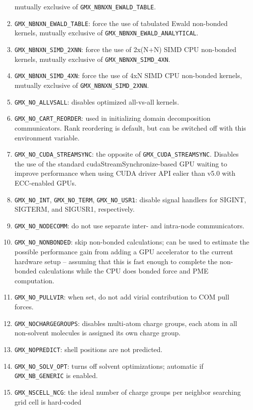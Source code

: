 \begin{enumerate}
        mutually exclusive of {\tt GMX_NBNXN_EWALD_TABLE}.
\item   {\tt GMX_NBNXN_EWALD_TABLE}: force the use of tabulated Ewald non-bonded kernels,
        mutually exclusive of {\tt GMX_NBNXN_EWALD_ANALYTICAL}.
\item   {\tt GMX_NBNXN_SIMD_2XNN}: force the use of 2x(N+N) SIMD CPU non-bonded kernels,
        mutually exclusive of {\tt GMX_NBNXN_SIMD_4XN}.
\item   {\tt GMX_NBNXN_SIMD_4XN}: force the use of 4xN SIMD CPU non-bonded kernels,
        mutually exclusive of {\tt GMX_NBNXN_SIMD_2XNN}.
\item   {\tt GMX_NO_ALLVSALL}: disables optimized all-vs-all kernels.
\item   {\tt GMX_NO_CART_REORDER}: used in initializing domain decomposition communicators. Rank reordering
        is default, but can be switched off with this environment variable.
\item   {\tt GMX_NO_CUDA_STREAMSYNC}: the opposite of {\tt GMX_CUDA_STREAMSYNC}. Disables the use of the
        standard cudaStreamSynchronize-based GPU waiting to improve performance when using CUDA driver API
        ealier than v5.0 with ECC-enabled GPUs.
\item   {\tt GMX_NO_INT}, {\tt GMX_NO_TERM}, {\tt GMX_NO_USR1}: disable signal handlers for SIGINT,
        SIGTERM, and SIGUSR1, respectively.
\item   {\tt GMX_NO_NODECOMM}: do not use separate inter- and intra-node communicators.
\item   {\tt GMX_NO_NONBONDED}: skip non-bonded calculations; can be used to estimate the possible
        performance gain from adding a GPU accelerator to the current hardware setup -- assuming that this is
        fast enough to complete the non-bonded calculations while the CPU does bonded force and PME computation.
\item   {\tt GMX_NO_PULLVIR}: when set, do not add virial contribution to COM pull forces.
\item   {\tt GMX_NOCHARGEGROUPS}: disables multi-atom charge groups, {\ie} each atom 
        in all non-solvent molecules is assigned its own charge group.
\item   {\tt GMX_NOPREDICT}: shell positions are not predicted.
\item   {\tt GMX_NO_SOLV_OPT}: turns off solvent optimizations; automatic if {\tt GMX_NB_GENERIC}
        is enabled.
\item   {\tt GMX_NSCELL_NCG}: the ideal number of charge groups per neighbor searching grid cell is hard-coded

\end{enumerate}
